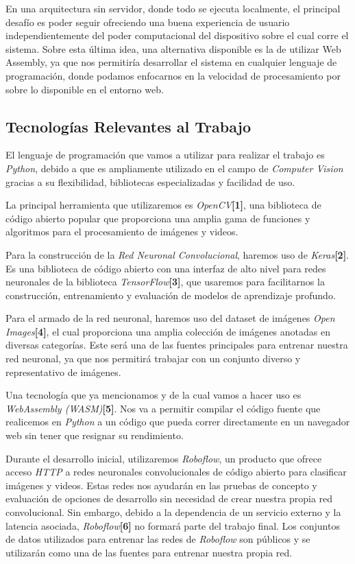 \documentclass[a4paper]{article}
\begin{document}
En una arquitectura sin servidor, donde todo se ejecuta localmente, el principal desafío es poder seguir ofreciendo una buena experiencia de usuario independientemente del poder computacional del dispositivo sobre el cual corre el sistema. Sobre esta última idea, una alternativa disponible es la de utilizar Web Assembly, ya que nos permitiría desarrollar el sistema en cualquier lenguaje de programación, donde podamos enfocarnos en la velocidad de procesamiento por sobre lo disponible en el entorno web.

\subsection{Tecnologías Relevantes al Trabajo}
El lenguaje de programación que vamos a utilizar para realizar el trabajo es \emph{Python}, debido a que es ampliamente utilizado en el campo de \emph{Computer Vision} gracias a su flexibilidad, bibliotecas especializadas y facilidad de uso.

La principal herramienta que utilizaremos es \emph{OpenCV}\textbf{[1]}, una biblioteca de código abierto popular que proporciona una amplia gama de funciones y algoritmos para el procesamiento de imágenes y videos.

Para la construcción de la \emph{Red Neuronal Convolucional}, haremos uso de \emph{Keras}\textbf{[2]}. Es una biblioteca de código abierto con una interfaz de alto nivel para redes neuronales de la biblioteca \emph{TensorFlow}\textbf{[3]}, que usaremos para facilitarnos la construcción, entrenamiento y evaluación de modelos de aprendizaje profundo.

Para el armado de la red neuronal, haremos uso del dataset de imágenes \emph{Open Images}\textbf{[4]}, el cual proporciona una amplia colección de imágenes anotadas en diversas categorías. Este será una de las fuentes principales para entrenar nuestra red neuronal, ya que nos permitirá trabajar con un conjunto diverso y representativo de imágenes.

Una tecnología que ya mencionamos y de la cual vamos a hacer uso es \emph{WebAssembly (WASM)}\textbf{[5]}. Nos va a permitir compilar el código fuente que realicemos en \emph{Python} a un código que pueda correr directamente en un navegador web sin tener que resignar su rendimiento.

Durante el desarrollo inicial, utilizaremos \emph{Roboflow}, un producto que ofrece acceso \emph{HTTP} a redes neuronales convolucionales de código abierto para clasificar imágenes y videos. Estas redes nos ayudarán en las pruebas de concepto y evaluación de opciones de desarrollo sin necesidad de crear nuestra propia red convolucional.
Sin embargo, debido a la dependencia de un servicio externo y la latencia asociada, \emph{Roboflow}\textbf{[6]} no formará parte del trabajo final. Los conjuntos de datos utilizados para entrenar las redes de \emph{Roboflow} son públicos y se utilizarán como una de las fuentes para entrenar nuestra propia red.
\end{document}
